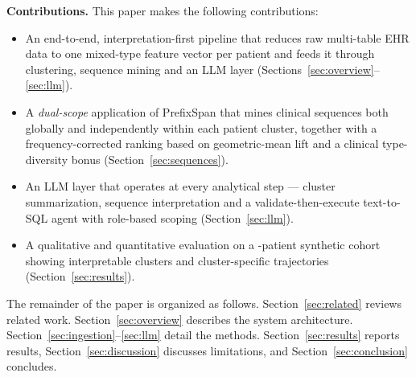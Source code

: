 \smallskip
\noindent\textbf{Contributions.} This paper makes the following contributions:
\begin{itemize}
  \item An end-to-end, interpretation-first pipeline that reduces raw multi-table
        EHR data to one mixed-type feature vector per patient and feeds it
        through clustering, sequence mining and an LLM layer
        (Sections~\ref{sec:overview}--\ref{sec:llm}).
  \item A \emph{dual-scope} application of PrefixSpan that mines clinical
        sequences both globally and independently within each patient cluster,
        together with a frequency-corrected ranking based on geometric-mean lift
        and a clinical type-diversity bonus (Section~\ref{sec:sequences}).
  \item An LLM layer that operates at every analytical step --- cluster
        summarization, sequence interpretation and a validate-then-execute
        text-to-SQL agent with role-based scoping
        (Section~\ref{sec:llm}).
  \item A qualitative and quantitative evaluation on a \NPATIENTS{}-patient
        synthetic cohort showing interpretable clusters and cluster-specific
        trajectories (Section~\ref{sec:results}).
\end{itemize}

The remainder of the paper is organized as follows.
Section~\ref{sec:related} reviews related work.
Section~\ref{sec:overview} describes the system architecture.
Section~\ref{sec:ingestion}--\ref{sec:llm} detail the methods.
Section~\ref{sec:results} reports results, Section~\ref{sec:discussion}
discusses limitations, and Section~\ref{sec:conclusion} concludes.
